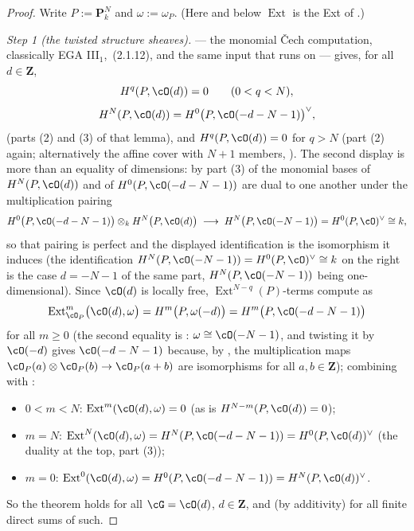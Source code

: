 \begin{proof}
Write $P:=\mathbf P^N_k$ and $\omega:=\omega_P$.  (Here and below
$\operatorname{Ext}$ is the Ext of .)

\emph{Step 1 (the twisted structure sheaves).}
 --- the monomial
Čech computation, classically EGA III$_1$, \,(2.1.12), and the same
input that  runs on --- gives, for all
$d\in\mathbf Z$,
\[
H^q(P,\cO(d))=0\qquad(0<q<N),
\]
\[
H^N(P,\cO(d))=H^0\bigl(P,\cO(-d-N-1)\bigr)^{\vee},
\]
(parts (2) and (3) of that lemma), and $H^q(P,\cO(d))=0$ for $q>N$
(part (2) again; alternatively the affine cover with $N+1$ members,
).  The second display is more than an
equality of dimensions: by part (3) of
 the monomial bases of
$H^N(P,\cO(d))$ and of $H^0(P,\cO(-d-N-1))$ are dual to one another
under the multiplication pairing
\[
H^0\bigl(P,\cO(-d-N-1)\bigr)\otimes_kH^N\bigl(P,\cO(d)\bigr)
\;\longrightarrow\;H^N\bigl(P,\cO(-N-1)\bigr)=H^0(P,\cO)^{\vee}\cong k ,
\]
so that pairing is perfect and the displayed identification is the
isomorphism it induces (the identification
$H^N(P,\cO(-N-1))=H^0(P,\cO)^{\vee}\cong k$ on the right is the case
$d=-N-1$ of the same part, $H^N(P,\cO(-N-1))$ being one-dimensional).
Since $\cO(d)$ is locally free,
$\operatorname{Ext}^{N-q}(P)$-terms compute as
\[
\operatorname{Ext}^{m}_{\cO_P}\bigl(\cO(d),\omega\bigr)
=H^{m}\bigl(P,\omega(-d)\bigr)
=H^{m}\bigl(P,\cO(-d-N-1)\bigr)
\]
for all $m\ge0$ (the second equality is
: $\omega\cong\cO(-N-1)$, and
twisting it by $\cO(-d)$ gives $\cO(-d-N-1)$ because, by
, the multiplication maps
$\cO_P(a)\otimes\cO_P(b)\to\cO_P(a+b)$ are isomorphisms for all
$a,b\in\mathbf Z$); combining with
:
\begin{itemize}
\item $0<m<N$: $\operatorname{Ext}^m(\cO(d),\omega)=0$ (as is
$H^{N-m}(P,\cO(d))=0$);
\item $m=N$: $\operatorname{Ext}^N(\cO(d),\omega)=H^N(P,\cO(-d-N-1))
=H^0(P,\cO(d))^{\vee}$ (the duality at the top, part (3));
\item $m=0$: $\operatorname{Ext}^0(\cO(d),\omega)=
H^0(P,\cO(-d-N-1))=H^N(P,\cO(d))^{\vee}$.
\end{itemize}
So the theorem holds for all $\cG=\cO(d)$, $d\in\mathbf Z$, and
(by additivity) for all finite direct sums of such.


\end{proof}
